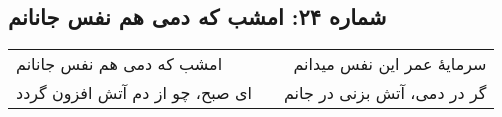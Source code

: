 \begin{center}
\section*{شماره ۲۴: امشب که دمی هم نفس جانانم}
\label{sec:024}
\begin{longtable}{l p{0.5cm} r}
امشب که دمی هم نفس جانانم
&&
سرمایهٔ عمر این نفس میدانم
\\
ای صبح، چو از دم آتش افزون گردد
&&
گر در دمی، آتش بزنی در جانم
\\
\end{longtable}
\end{center}
